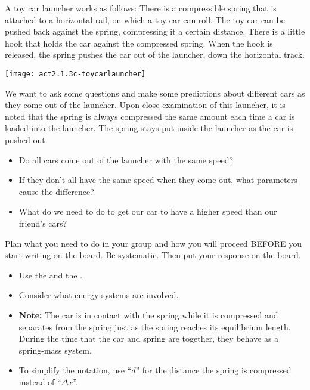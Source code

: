 \begin{benumerate}

	A toy car launcher works as follows:  There is a compressible spring that is attached to a horizontal rail, on which a toy car can roll. The toy car can be pushed back against the spring, compressing it a certain distance. There is a little hook that holds the car against the compressed spring. When the hook is released, the spring pushes the car out of the launcher, down the horizontal track.
	
\begin{center}
	\texttt{[image: act2.1.3c-toycarlauncher]}	
\end{center}
	
	We want to ask some questions and make some predictions about different cars as they come out of the launcher.  Upon close examination of this launcher, it is noted that the spring is always compressed the same amount each time a car is loaded into the launcher. The spring stays put inside the launcher as the car is pushed out.

	
	\begin{itemize}
		\item Do all cars come out of the launcher with the same speed?  
		\item If they don't all have the same speed when they come out, what parameters cause the difference?
		\item What do we need to do to get our car to have a higher speed than our friend's cars?
	\end{itemize}
	

	Plan what you need to do in your group and how you will proceed BEFORE you start writing on the board.  Be systematic.  Then put your response on the board.	

	
	\begin{itemize}
		\item Use the \EnergyInteractionModel{} and the \SOModel{}.
		\item Consider what energy systems are involved.
		\item \textbf{Note:} The car is in contact with the spring while it is compressed and separates from the spring just as the spring reaches its equilibrium length. During the time that the car and spring are together, they behave as a spring-mass system.
		\item To simplify the notation, use ``$d$'' for the distance the spring is compressed instead of ``$\Delta x$''.
	\end{itemize}
	
\end{benumerate}

\WCD
